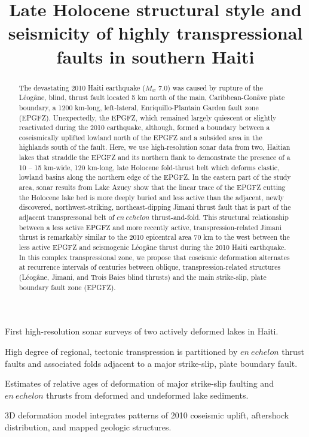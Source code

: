 \documentclass[linenumbers,draft]{agujournal}
\begin{document}
\title{Late Holocene structural style and seismicity of highly transpressional faults in southern Haiti}



\begin{keypoints}
\item First high-resolution sonar surveys of two actively deformed lakes in Haiti.
\item High degree of regional, tectonic transpression is partitioned by $en~echelon$ thrust faults and associated folds adjacent to a major strike-slip, plate boundary fault.
\item Estimates of relative ages of deformation of major strike-slip faulting and $en~echelon$ thrusts from deformed and undeformed lake sediments.
\item 3D deformation model integrates patterns of 2010 coseismic uplift, aftershock distribution, and mapped geologic structures.
\end{keypoints}

\begin{abstract}
The devastating 2010 Haiti earthquake ($M_w$ 7.0) was caused by rupture of the L\'eog\^ane, blind, thrust fault located 5 km north of the main, Caribbean-Gon\^ave plate boundary, a 1200 km-long, left-lateral, Enriquillo-Plantain Garden fault zone (EPGFZ). Unexpectedly, the EPGFZ, which remained largely quiescent or slightly reactivated during the 2010 earthquake, although, formed a boundary between a coseismically uplifted lowland north of the EPGFZ and a subsided area in the highlands south of the fault. Here, we use high-resolution sonar data from two, Haitian lakes that straddle the EPGFZ and its northern flank to demonstrate the presence of a 10 -- 15 km-wide, 120 km-long, late Holocene fold-thrust belt which deforms clastic, lowland basins along the northern edge of the EPGFZ. In the eastern part of the study area, sonar results from Lake Azuey show that the linear trace of the EPGFZ cutting the Holocene lake bed is more deeply buried and less active than the adjacent, newly discovered, northwest-striking, northeast-dipping Jimani thrust fault that is part of the adjacent transpressonal belt of $en~echelon$ thrust-and-fold. This structural relationship between a less active EPGFZ and more recently active, transpression-related Jimani thrust is remarkably similar to the 2010 epicentral area 70 km to the west between the less active EPGFZ and seismogenic L\'eog\^ane thrust during the 2010 Haiti earthquake. In this complex transpressional zone, we propose that coseismic deformation alternates at recurrence intervals of centuries between oblique, transpression-related structures (L\'eog\^ane, Jimani, and Trois Baies blind thrusts) and the main strike-slip, plate boundary fault zone (EPGFZ).
\end{abstract}
\end{document}
